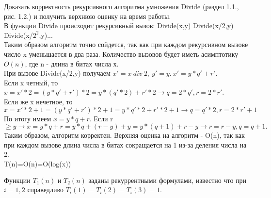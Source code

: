 \documentclass[12pt]{extreport}
\theoremstyle{definiton}
\theoremstyle{definition}
\theoremstyle{definition}
\let\geq\geqslant
\def\prend{
	\bigskip
}
\begin{document}
	\Pr[3][ДПВ 1.8] Доказать корректность рекурсивного алгоритма умножения Divide (раздел 1.1., рис. 1.2.) и получить верхнюю оценку на время работы.
	\newline
    \\В функции Divide происходит рекурсивный вызов: Divide(x,y) \to Divide(x/2,y) \to Divide(x/$2^{2}$,y)...
    \\Таким образом алгоритм точно сойдется, так как при каждом рекурсивном вызове число x уменьшается в два раза. Количество вызовов будет иметь асимптотику $O(n)$, где n - длина в битах числа х.
    \\При вызове Divide(x/2,y) получаем $x'=x\ div\ 2,\ y'=y.\ x'=y*q'+r'$.
    \\Если x четный, то $x = x' * 2 = (y*q'+r')*2=y*(q'*2)+r'*2 \to q = 2*q', r = 2*r'$.
    \\Если же x нечетное, то $x = x' * 2 + 1=(y*q'+r')*2+1=y*q'*2+r'*2+1 \to q = q'*2,r=2*r'+1$
    \\По итогу имеем $x=y*q+r$. Если r $\geq y \to x = y*q + r = y*q+(r-y)+y=y*(q+1)+r-y \to r = r-y, q=q+1.$
    \\Таким образом, алгоритм корректен. Верхняя оценка на алгоритм - O(n), так как при каждом вызове длина числа в битах сокращается на 1 из-за деления числа на 2. 
    \\T(n)=O(n)=O(log(x))
	\prend
		

	\Pr[5] Функции $T_1(n)$ и $T_2(n)$ заданы рекуррентными формулами, известно что при $i = 1,2$ справедливо $T_i(1) = T_i(2) = T_i(3) = 1$.
\end{document}
